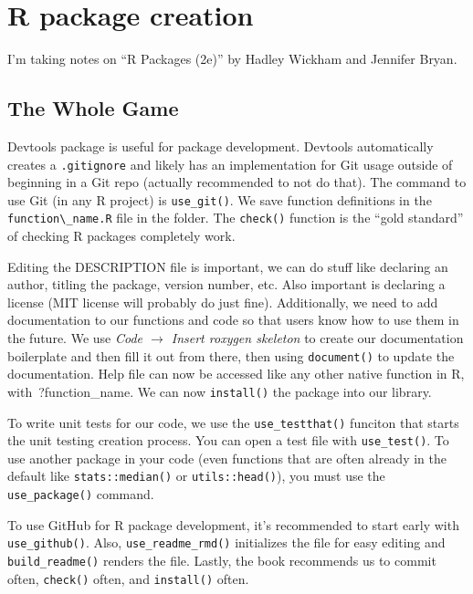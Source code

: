 \documentclass[12pt]{article}
\begin{document}
\section{R package creation}
I'm taking notes on ``R Packages (2e)'' by Hadley Wickham and Jennifer Bryan.

\subsection{The Whole Game}
Devtools package is useful for package development. Devtools automatically creates a \verb|.gitignore| and likely has an implementation for Git usage outside of beginning in a Git repo (actually recommended to not do that). The command to use Git (in any R project) is \verb|use_git()|. We save function definitions in the \verb|function\_name.R| file in the folder. The \verb|check()| function is the ``gold standard'' of checking R packages completely work.

Editing the DESCRIPTION file is important, we can do stuff like declaring an author, titling the package, version number, etc. Also important is declaring a license (MIT license will probably do just fine). Additionally, we need to add documentation to our functions and code so that users know how to use them in the future. We use \textit{Code $\rightarrow$ Insert roxygen skeleton} to create our documentation boilerplate and then fill it out from there, then using \verb|document()| to update the documentation. Help file can now be accessed like any other native function in R, with \,?function\_name. We can now \verb|install()| the package into our library. 

To write unit tests for our code, we use the \verb|use_testthat()| funciton that starts the unit testing creation process. You can open a test file with \verb|use_test()|. To use another package in your code (even functions that are often already in the default like \verb|stats::median()| or \verb|utils::head()|), you must use the \verb|use_package()| command. 

To use GitHub for R package development, it's recommended to start early with \verb|use_github()|. Also, \verb|use_readme_rmd()| initializes the file for easy editing and \verb|build_readme()| renders the file. Lastly, the book recommends us to commit often, \verb|check()| often, and \verb|install()| often.
\end{document}
